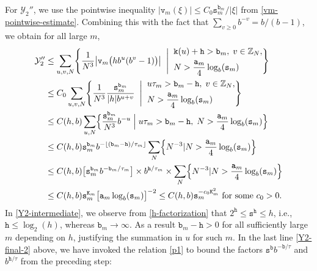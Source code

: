 \documentclass[12pt, twoside]{article}
\theoremstyle{definition}
\numberwithin{equation}{section}
\begin{document}
\vskip0.1in
\noindent For $\mathcal Y_2''$, we use the pointwise inequality $|\mathtt v_m(\xi)| \leq C_0 \mathtt s_m^{\mathtt b_m}/|\xi|$ from \eqref{vm-pointwise-estimate}. Combining this with the fact that $\sum_{v \geq 0} b^{-v} = b/(b-1)$, we obtain  for all large $m$, 
\begin{align} 
\mathcal Y_{2}'' &\leq \sum_{u, v, N} \Biggl\{\frac{1}{N^3}\bigl| \mathtt v_m \bigl(hb^u(b^v-1) \bigr) \bigr| \; \; \Biggl| \; \; \begin{aligned} &  \mathtt k(u) + \mathtt h >  \mathtt b_m, \; v \in \mathbb Z_N, \\  &N > \frac{\mathtt a_m}{4} \log_b (\mathtt s_m)\end{aligned} \Biggr\} \nonumber \\ 
&\leq C_0 \sum_{u, v, N}  \Biggl\{\frac{1}{N^3} \frac{\mathtt s_m^{\mathtt b_m}}{|h|b^{u+v}} \; \; \Biggl| \; \; \begin{aligned} &  u\tau_m >  \mathtt b_m - \mathtt h, \; v \in \mathbb Z_N, \\  &N > \frac{\mathtt a_m}{4} \log_b (\mathtt s_m)  \end{aligned} \Biggr\} \nonumber \\ 
&\leq C(h, b) \sum_{u, N} \Bigl\{ \frac{\mathtt s_m^{\mathtt b_m}}{N^3} b^{-u} \; \Bigl| \; u\tau_m >  \mathtt b_m - \mathtt h, \; N > \frac{\mathtt a_m}{4} \log_b (\mathtt s_m)  \Bigr\} \label{Y2-intermediate} \\ 
&\leq C(h, b) \mathtt s_m^{\mathtt b_m} b^{- \lfloor(\mathtt b_m - \mathtt h)/\tau_m \rfloor} \sum_N \Bigl\{N^{-3} | N > \frac{\mathtt a_m}{4}  \log_b (\mathtt s_m) \Bigr\} \nonumber \\  
& \leq C(h, b) \bigl[\mathtt s_m^{\mathtt b_m} b^{-\mathtt b_m /\tau_m} \bigr] \times b^{\mathtt h/\tau_m} \times \sum_N \Bigl\{N^{-3} | N > \frac{\mathtt a_m}{4}  \log_b (\mathtt s_m) \Bigr\} \nonumber  \\ 
&\leq C(h, b) \mathtt s_m^{\mathtt K_m} \bigl[ \mathtt a_m \log_b (\mathtt s_m) \bigr]^{-2}  \leq C(h, b) \mathtt s_m^{- c_0 \mathtt K_m^2} \text{ for some } c_0 > 0. \label{Y2-final-2}
\end{align} 
In \eqref{Y2-intermediate}, we observe from \eqref{h-factorization} that $2^{\mathtt h} \leq \mathtt s^{\mathtt h} \leq h$, i.e., $\mathtt h \leq \log_2(h)$, whereas $\mathtt b_m \rightarrow \infty$. As a result $\mathtt b_m - \mathtt h >0$ for all sufficiently large $m$ depending on $h$, justifying the summation in $u$ for such $m$.
In the last line \eqref{Y2-final-2} above, we have invoked the relation \eqref{p1} to bound the factors $\mathtt s^{\mathtt b} b^{-\mathtt b/\tau}$ and $b^{\mathtt h/\tau}$ from the preceding step:
\end{document}
